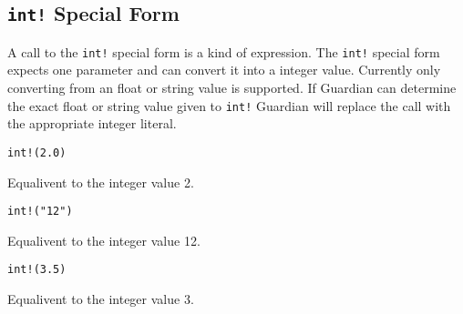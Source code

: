 
\subsection{\texttt{int!} Special Form}
{
	A call to the \texttt{int!} special form is a kind of expression.
	The \texttt{int!} special form expects one parameter and can convert it
	into a integer value. Currently only converting from an float or string
	value is supported.
	If Guardian can determine the exact float or string value given to
	\texttt{int!} Guardian will replace the call with the appropriate
	integer literal.
	
	\begin{itemize}
	{
		\item \texttt{int!(2.0)}
		
			Equalivent to the integer value 2.
		
		\item \texttt{int!("12")}
		
			Equalivent to the integer value 12.
		
		\item \texttt{int!(3.5)}
		
			Equalivent to the integer value 3.
	}
	\end{itemize}
}
